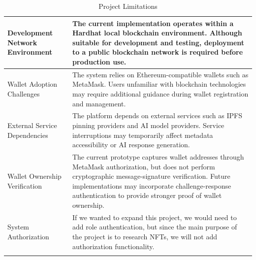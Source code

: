 \begin{longtable}{|m{3.5cm}|m{10.5cm}|}
    \hline
    
    Development Network Environment 
    & The current implementation operates within a Hardhat local blockchain environment. Although suitable for development and testing, deployment to a public blockchain network is required before production use.\\
    \hline

    Wallet Adoption Challenges
    & The system relies on Ethereum-compatible wallets such as MetaMask. Users unfamiliar with blockchain technologies may require additional guidance during wallet registration and management.\\
    \hline

    External Service Dependencies
    & The platform depends on external services such as IPFS pinning providers and AI model providers. Service interruptions may temporarily affect metadata accessibility or AI response generation.\\
    \hline

    Wallet Ownership Verification
    & The current prototype captures wallet addresses through MetaMask authorization, but does not perform cryptographic message-signature verification. Future implementations may incorporate challenge-response authentication to provide stronger proof of wallet ownership.\\
    \hline

    System Authorization
    & If we wanted to expand this project, we would need to add role authentication, but since the main purpose of the project is to research NFTs, we will not add authorization functionality.\\
    \hline

    \caption{Project Limitations}
    \label{tab:project_limitations}
\end{longtable}